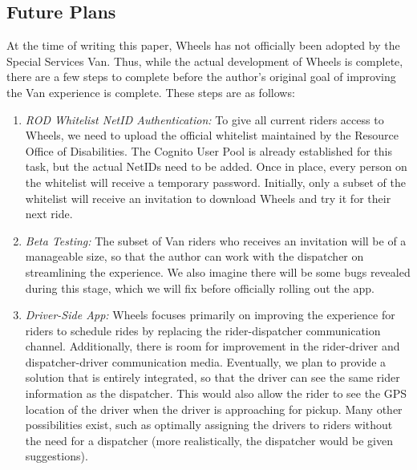 \documentclass[12pt, a4paper]{article}
\begin{document}
\begin{multicols*}{2}
\section{Future Plans}\label{sec:future-plans}
At the time of writing this paper, Wheels has not officially been adopted by the Special Services Van. Thus, while the actual development of Wheels is complete, there are a few steps to complete before the author's original goal of improving the Van experience is complete. These steps are as follows:
\begin{enumerate}[label=(\roman*)]
	\item \textit{ROD Whitelist NetID Authentication:} To give all current riders access to Wheels, we need to upload the official whitelist maintained by the Resource Office of Disabilities. The Cognito User Pool is already established for this task, but the actual NetIDs need to be added. Once in place, every person on the whitelist will receive a temporary password. Initially, only a subset of the whitelist will receive an invitation to download Wheels and try it for their next ride.
	\item \textit{Beta Testing:} The subset of Van riders who receives an invitation will be of a manageable size, so that the author can work with the dispatcher on streamlining the experience. We also imagine there will be some bugs revealed during this stage, which we will fix before officially rolling out the app.
	\item \textit{Driver-Side App:} Wheels focuses primarily on improving the experience for riders to schedule rides by replacing the rider-dispatcher communication channel. Additionally, there is room for improvement in the rider-driver and dispatcher-driver communication media. Eventually, we plan to provide a solution that is entirely integrated, so that the driver can see the same rider information as the dispatcher. This would also allow the rider to see the GPS location of the driver when the driver is approaching for pickup. Many other possibilities exist, such as optimally assigning the drivers to riders without the need for a dispatcher (more realistically, the dispatcher would be given suggestions).

\end{enumerate}
\end{multicols*}
\end{document}

